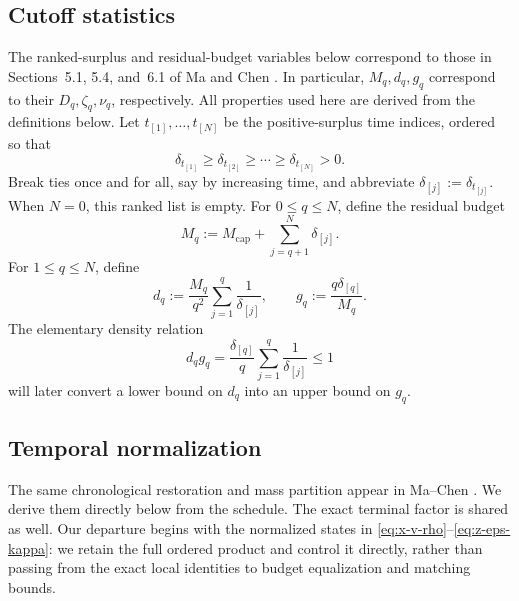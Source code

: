\documentclass[11pt]{article}
\theoremstyle{definition}
\theoremstyle{remark}
\newcommand{\rankmass}{M}
\newcommand{\rankdens}{d}
\newcommand{\rankgain}{g}
\begin{document}
\subsection{Cutoff statistics}

The ranked-surplus and residual-budget variables below correspond to those
in Sections~5.1, 5.4, and~6.1 of Ma and Chen \cite{machen2026}.  In
particular, \(\rankmass_q,\rankdens_q,\rankgain_q\) correspond to their
\(D_q,\zeta_q,\nu_q\), respectively.  All properties used here are derived
from the definitions below.
Let \(t_{[1]},\ldots,t_{[N]}\) be the positive-surplus time indices, ordered
so that
\[
 \delta_{t_{[1]}}\ge\delta_{t_{[2]}}\ge\cdots\ge\delta_{t_{[N]}}>0.
\]
Break ties once and for all, say by increasing time, and abbreviate
\(\delta_{[j]}:=\delta_{t_{[j]}}\).  When \(N=0\), this ranked list is empty.
For \(0\le q\le N\), define the residual budget
\begin{equation}
  \rankmass_q
  :=\rankmass_{\mathrm{cap}}+\sum_{j=q+1}^N\delta_{[j]}.
  \label{eq:Dq}
\end{equation}
For \(1\le q\le N\), define
\begin{equation}
 \rankdens_q
 :=\frac{\rankmass_q}{q^2}\sum_{j=1}^q\frac1{\delta_{[j]}},
 \qquad
 \rankgain_q:=\frac{q\delta_{[q]}}{\rankmass_q}.
 \label{eq:zeta-nu}
\end{equation}
The elementary density relation
\begin{equation}
 \rankdens_q\rankgain_q
 =\frac{\delta_{[q]}}{q}\sum_{j=1}^q\frac1{\delta_{[j]}}
 \le1
 \label{eq:zeta-nu-product}
\end{equation}
will later convert a lower bound on \(\rankdens_q\) into an upper bound on
\(\rankgain_q\).

\subsection{Temporal normalization}

The same chronological restoration and mass partition appear in Ma--Chen
\cite[Section~5.1 and Equation~(24)]{machen2026}.  We derive them directly
below from the schedule.  The exact terminal factor is shared as well.  Our
departure begins with the normalized states in
\eqref{eq:x-v-rho}--\eqref{eq:z-eps-kappa}: we retain the full ordered
product and control it directly, rather than passing from the exact local
identities to budget equalization and matching bounds.
\end{document}
